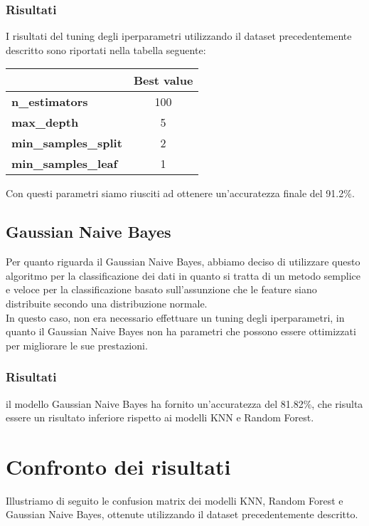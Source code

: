 \documentclass[../../Report.tex]{subfiles}
\begin{document}
\subsubsection{Risultati}
I risultati del tuning degli iperparametri utilizzando il dataset precedentemente descritto sono riportati nella tabella seguente:

\begin{table}[H]
    \centering
    \begin{tabular}{|l|c|}
        \hline
        & \textbf{Best value} \\
        \hline
        \textbf{n\_estimators} & 100 \\
        \hline
        \textbf{max\_depth} & 5 \\
        \hline
        \textbf{min\_samples\_split} & 2 \\
        \hline
        \textbf{min\_samples\_leaf} & 1 \\
        \hline
    \end{tabular}
\end{table}

Con questi parametri siamo riusciti ad ottenere un'accuratezza finale del 91.2\%.

\subsection{Gaussian Naive Bayes}
Per quanto riguarda il Gaussian Naive Bayes, abbiamo deciso di utilizzare questo algoritmo per la classificazione dei dati in quanto si tratta di un metodo semplice e veloce per la classificazione basato sull'assunzione che le feature siano distribuite secondo una distribuzione normale.\\
In questo caso, non era necessario effettuare un tuning degli iperparametri, in quanto il Gaussian Naive Bayes non ha parametri che possono essere ottimizzati per migliorare le sue prestazioni.

\subsubsection{Risultati}
il modello Gaussian Naive Bayes ha fornito un'accuratezza del 81.82\%, che risulta essere un risultato inferiore rispetto ai modelli KNN e Random Forest.

\section{Confronto dei risultati}
Illustriamo di seguito le confusion matrix dei modelli KNN, Random Forest e Gaussian Naive Bayes, ottenute utilizzando il dataset precedentemente descritto.


\end{document}
